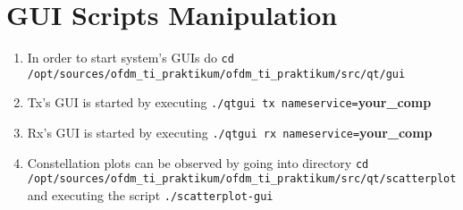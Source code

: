 \section {GUI Scripts Manipulation}\label{app:guiman}
\begin{enumerate}
		\item In order to start system's GUIs do \newline 
	\texttt{cd /opt/sources/ofdm\_ti\_praktikum/ofdm\_ti\_praktikum/src/qt/gui}
	\item Tx's GUI is started by executing\newline
	\texttt{./qtgui \option tx \option nameservice=}\textbf{your\_comp}
	\item Rx's GUI is started by executing\newline
	\texttt{./qtgui \option rx \option nameservice=}\textbf{your\_comp}
	\item Constellation plots can be observed by going into directory \newline 
	\texttt{cd /opt/sources/ofdm\_ti\_praktikum/ofdm\_ti\_praktikum/src/qt/scatterplot}
	\newline and executing the script \newline 
	\texttt{./scatterplot-gui}
\end{enumerate}
